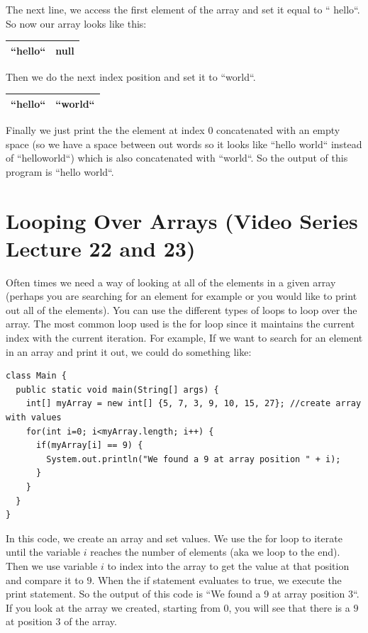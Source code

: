 \documentclass[11]{article}
\begin{document}
The next line, we access the first element of the array and set it equal to `` hello``. So now our array looks like this:

\begin{center}
	\begin{tabular}{ | c | c | } \hline
 	``hello`` & null  \\   \hline
	\end{tabular}
\end{center}

Then we do the next index position and set it to ``world``. 

\begin{center}
	\begin{tabular}{ | c | c | } \hline
 	``hello`` & ``world``  \\   \hline
	\end{tabular}
\end{center}

Finally we just print the the element at index $0$ concatenated with an empty space (so we have a space between out words so it looks like ``hello world`` instead of ``helloworld``) which is also concatenated with ``world``. So the output of this program is ``hello world``.	

\section{Looping Over Arrays (Video Series Lecture 22 and 23)}
Often times we need a way of looking at all of the elements in a given array (perhaps you are searching for an element for example or you would like to print out all of the elements). You can use the different types of loops to loop over the array. The most common loop used is the for loop since it maintains the current index with the current iteration. For example, If we want to search for an element in an array and print it out, we could do something like:

\begin{lstlisting}
class Main {
  public static void main(String[] args) {
    int[] myArray = new int[] {5, 7, 3, 9, 10, 15, 27}; //create array with values
    for(int i=0; i<myArray.length; i++) {
      if(myArray[i] == 9) {
        System.out.println("We found a 9 at array position " + i);
      }
    }
  }
}
\end{lstlisting}
In this code, we create an array and set values. We use the for loop to iterate until the variable $i$ reaches the number of elements (aka we loop to the end). Then we use variable $i$ to index into the array to get the value at that position and compare it to $9$. When the if statement evaluates to true, we execute the print statement. So the output of this code is ``We found a 9 at array position $3$``. If you look at the array we created, starting from $0$, you will see that there is a $9$ at position $3$ of the array.\\
\end{document}

